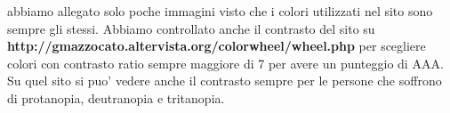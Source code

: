 abbiamo allegato solo poche immagini visto che i colori utilizzati nel sito sono sempre gli stessi.\newline
Abbiamo controllato anche il contrasto del sito su \textbf{http://gmazzocato.altervista.org/colorwheel/wheel.php} per scegliere colori con contrasto ratio sempre maggiore di 7 per avere un punteggio di AAA. Su quel sito si puo' vedere anche il contrasto sempre per le persone che soffrono di protanopia, deutranopia e tritanopia.
